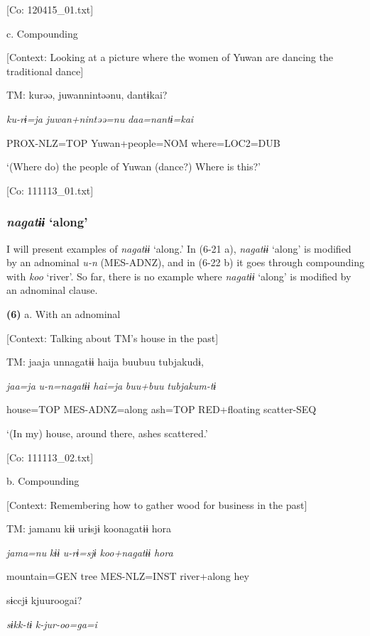       [Co: 120415\_01.txt]

  c.  Compounding

    [Context: Looking at a picture where the women of Yuwan are dancing the traditional dance]

    TM:  kurəə,  juwannintəənu,  dantɨkai?

      \textit{ku-rɨ=ja}  \textit{juwan+nintəə=nu}  \textit{daa=nantɨ=kai}

      PROX-NLZ=TOP  Yuwan+people=NOM  where=LOC2=DUB

      ‘(Where do) the people of Yuwan (dance?) Where is this?’

      [Co: 111113\_01.txt]

\subsubsection{\textit{nagatɨɨ} ‘along’}

I will present examples of \textit{nagatɨɨ} ‘along.’ In (6-21 a), \textit{nagatɨɨ} ‘along’ is modified by an adnominal \textit{u-n} (MES-ADNZ), and in (6-22 b) it goes through compounding with \textit{koo} ‘river’. So far, there is no example where \textit{nagatɨɨ} ‘along’ is modified by an adnominal clause.

\textbf{(6)}  a.  With an adnominal

    [Context: Talking about TM’s house in the past]

    TM:  jaaja  unnagatɨɨ  haija  buubuu  tubjakudɨ,

      \textit{jaa=ja}  \textit{u-n=nagatɨɨ}  \textit{hai=ja}  \textit{buu+buu}  \textit{tubjakum-tɨ}

      house=TOP  MES-ADNZ=along  ash=TOP  RED+floating  scatter-SEQ

      ‘(In my) house, around there, ashes scattered.’

      [Co: 111113\_02.txt]

  b.  Compounding

    [Context: Remembering how to gather wood for business in the past]

    TM:  jamanu  kɨɨ  urɨsjɨ  koonagatɨɨ  {\textbar}hora{\textbar}

      \textit{jama=nu}  \textit{kɨɨ}  \textit{u-rɨ=sjɨ}  \textit{koo+nagatɨɨ}  \textit{hora}

      mountain=GEN  tree  MES-NLZ=INST  river+along  hey

      sɨccjɨ  kjuuroogai?

      \textit{sɨkk-tɨ}  \textit{k-jur-oo=ga=i}

